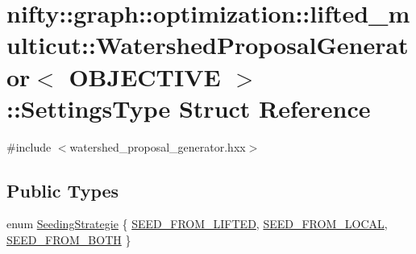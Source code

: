 \hypertarget{structnifty_1_1graph_1_1optimization_1_1lifted__multicut_1_1WatershedProposalGenerator_1_1SettingsType}{}\section{nifty\+:\+:graph\+:\+:optimization\+:\+:lifted\+\_\+multicut\+:\+:Watershed\+Proposal\+Generator$<$ O\+B\+J\+E\+C\+T\+I\+V\+E $>$\+:\+:Settings\+Type Struct Reference}
\label{structnifty_1_1graph_1_1optimization_1_1lifted__multicut_1_1WatershedProposalGenerator_1_1SettingsType}


{\ttfamily \#include $<$watershed\+\_\+proposal\+\_\+generator.\+hxx$>$}

\subsection*{Public Types}
\begin{DoxyCompactItemize}
\item 
enum \hyperlink{structnifty_1_1graph_1_1optimization_1_1lifted__multicut_1_1WatershedProposalGenerator_1_1SettingsType_aa5d0c216a42e941831b7277240a7ab31}{Seeding\+Strategie} \{ \hyperlink{structnifty_1_1graph_1_1optimization_1_1lifted__multicut_1_1WatershedProposalGenerator_1_1SettingsType_aa5d0c216a42e941831b7277240a7ab31afe3ffb32ebfdd45da4b4735739755fec}{S\+E\+E\+D\+\_\+\+F\+R\+O\+M\+\_\+\+L\+I\+F\+T\+E\+D}, 
\hyperlink{structnifty_1_1graph_1_1optimization_1_1lifted__multicut_1_1WatershedProposalGenerator_1_1SettingsType_aa5d0c216a42e941831b7277240a7ab31a6d89834038962a7c393cf1889387f9b6}{S\+E\+E\+D\+\_\+\+F\+R\+O\+M\+\_\+\+L\+O\+C\+A\+L}, 
\hyperlink{structnifty_1_1graph_1_1optimization_1_1lifted__multicut_1_1WatershedProposalGenerator_1_1SettingsType_aa5d0c216a42e941831b7277240a7ab31a5cec680b7490e0c1d0fcd55e7640d8d0}{S\+E\+E\+D\+\_\+\+F\+R\+O\+M\+\_\+\+B\+O\+T\+H}
 \}
\end{DoxyCompactItemize}
